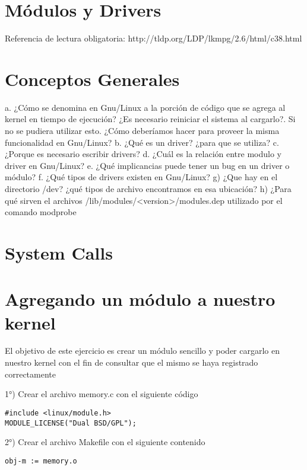 \section{Módulos y Drivers}

Referencia de lectura obligatoria: http://tldp.org/LDP/lkmpg/2.6/html/c38.html

\section{Conceptos Generales}
\begin{questions}
\question a. ¿Cómo se denomina en Gnu/Linux a la porción de código que se agrega al kernel en tiempo de ejecución? ¿Es necesario reiniciar el sistema al cargarlo?.  Si no se pudiera utilizar esto. ¿Cómo deberíamos hacer para proveer la misma funcionalidad en Gnu/Linux?
\question b. ¿Qué es un driver? ¿para que se utiliza?
\question c. ¿Porque es necesario escribir drivers?
\question d. ¿Cuál es la relación entre modulo y driver en Gnu/Linux?
\question e. ¿Qué implicancias puede tener un bug en un driver o módulo?
\question f. ¿Qué tipos de drivers existen en Gnu/Linux?
\question g) ¿Que hay en el directorio /dev? ¿qué tipos de archivo encontramos en esa ubicación?
\question h) ¿Para qué sirven el archivos /lib/modules/<version>/modules.dep utilizado por el comando modprobe

\end{questions}
\section{System Calls}

\section{Agregando un módulo a nuestro kernel}
El objetivo de este ejercicio es crear un módulo sencillo y poder cargarlo en nuestro kernel con el fin de consultar que el mismo se haya registrado correctamente

1°) Crear el archivo memory.c con el siguiente código

\begin{verbatim}
#include <linux/module.h>
MODULE_LICENSE("Dual BSD/GPL");	
\end{verbatim}

2°) Crear el archivo Makefile con el siguiente contenido

\begin{verbatim}
obj-m := memory.o
\end{verbatim}

